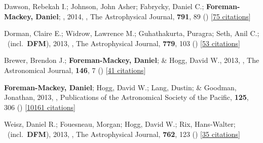 \item[{\color{numcolor}\scriptsize5}] Dawson, Rebekah I.; Johnson, John Asher; Fabrycky, Daniel C.; \textbf{Foreman-Mackey, Daniel}; \etal, 2014, , The Astrophysical Journal, \textbf{791}, 89 () [\href{https://ui.adsabs.harvard.edu/abs/2014ApJ...791...89D}{75 citations}]

\item[{\color{numcolor}\scriptsize4}] Dorman, Claire E.; Widrow, Lawrence M.; Guhathakurta, Puragra; Seth, Anil C.; \etal\ (incl.\ \textbf{DFM}), 2013, , The Astrophysical Journal, \textbf{779}, 103 () [\href{https://ui.adsabs.harvard.edu/abs/2013ApJ...779..103D}{53 citations}]

\item[{\color{numcolor}\scriptsize3}] Brewer, Brendon J.; \textbf{Foreman-Mackey, Daniel}; \& Hogg, David W., 2013, , The Astronomical Journal, \textbf{146}, 7 () [\href{https://ui.adsabs.harvard.edu/abs/2013AJ....146....7B}{41 citations}]

\item[{\color{numcolor}\scriptsize2}] \textbf{Foreman-Mackey, Daniel}; Hogg, David W.; Lang, Dustin; \& Goodman, Jonathan, 2013, , Publications of the Astronomical Society of the Pacific, \textbf{125}, 306 () [\href{https://ui.adsabs.harvard.edu/abs/2013PASP..125..306F}{10161 citations}]

\item[{\color{numcolor}\scriptsize1}] Weisz, Daniel R.; Fouesneau, Morgan; Hogg, David W.; Rix, Hans-Walter; \etal\ (incl.\ \textbf{DFM}), 2013, , The Astrophysical Journal, \textbf{762}, 123 () [\href{https://ui.adsabs.harvard.edu/abs/2013ApJ...762..123W}{35 citations}]